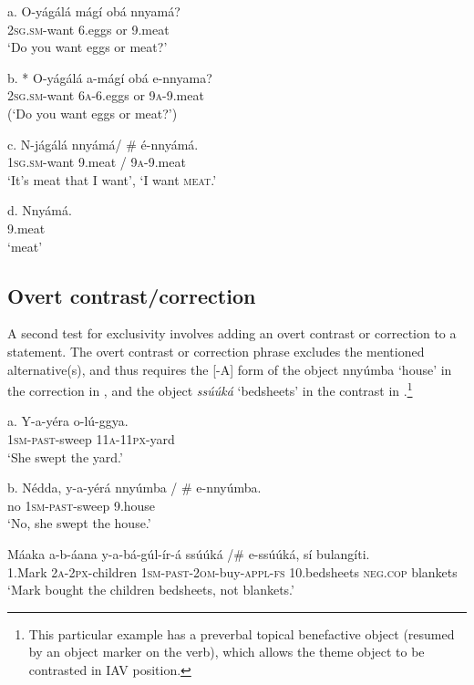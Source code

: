 \documentclass[output=paper]{langsci/langscibook}
\begin{document}
\ea
\gll   a.  O-yágálá    mágí    obá  nnyamá?\\
         \textsc{2sg}.\textsc{sm}-want    6.eggs    or  9.meat \\
\glt     ‘Do you want eggs or meat?’
\z

\ea
\gll   b.  * O-yágálá    a-mágí  obá  e-nnyama?\\
         \textsc{2sg}.\textsc{sm}-want    \textsc{6a}-6.eggs  or  \textsc{9a}-9.meat\\
\glt     (‘Do you want eggs or meat?’)
\z

\ea
\gll   c.  N-jágálá    nnyámá/ \# é-nnyámá.\\
         \textsc{1sg}.\textsc{sm}-want    9.meat / \textsc{9a}-9.meat\\
\glt     ‘It’s meat that I want’, ‘I want \textsc{meat}.’
\z

\ea
\gll   d.  Nnyámá.\\
         9.meat\\
\glt     ‘meat’
\z

\subsection{Overt contrast/correction} %

A second test for exclusivity involves adding an overt contrast or correction to a statement. The overt contrast or correction phrase excludes the mentioned alternative(s), and thus requires the [-A] form of the object nnyúmba ‘house’ in the correction in , and the object \textit{ssúúká} ‘bedsheets’ in the contrast in .\footnote{This particular example has a preverbal topical benefactive object (resumed by an object marker on the verb), which allows the theme object to be contrasted in IAV position.}

\ea
\gll   a.  Y-a-yéra    o-lú-ggya.\\
         \textsc{1sm}-\textsc{past}-sweep  \textsc{11a}-\textsc{11px}-yard\\
\glt     ‘She swept the yard.’
\z

\ea
\gll   b.  Nédda,  y-a-yérá    nnyúmba / \# e-nnyúmba.\\
         no    \textsc{1sm}-\textsc{past}-sweep  9.house\\
\glt     ‘No, she swept the house.’
\z

\ea
\gll   Máaka  a-b-áana    y-a-bá-gúl-ír-á        ssúúká /\# e-ssúúká,  sí    bulangíti.\\
       1.Mark  \textsc{2a}-\textsc{2px}-children  \textsc{1sm}-\textsc{past}-\textsc{2om}-buy-\textsc{appl}-\textsc{fs}  10.bedsheets     \textsc{neg}.\textsc{cop}  blankets\\
    ‘Mark bought the children bedsheets, not blankets.’
\z
\end{document}
